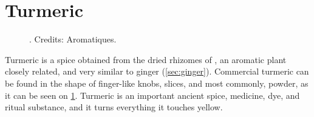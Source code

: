 \section{Turmeric}
\label{sec:turmeric}



\begin{figure}[!ht]
	\vspace{-4ex}
	\centering
	\hfill
	\hfill
	\caption{ . Credits: Aromatiques.}
	\label{fig:turmeric_imgs}
\end{figure}

Turmeric is a spice obtained from the dried rhizomes of , an aromatic plant closely related, and very similar to ginger (\cref{sec:ginger}). Commercial turmeric can be found in the shape of finger-like knobs, slices, and most commonly, powder, as it can be seen on \cref{fig:turmeric_imgs}. Turmeric is an important ancient spice, medicine, dye, and ritual substance, and it turns everything it touches yellow.

